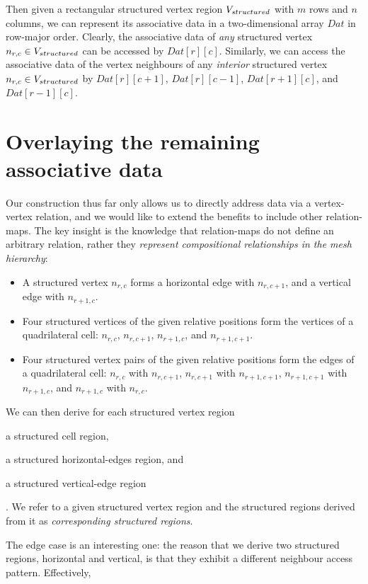 Then given a rectangular structured vertex region $V_{structured}$ with $m$ rows and $n$ columns, we can represent its associative data in a two-dimensional array $Dat$ in row-major order. Clearly, the associative data of \emph{any} structured vertex $n_{r,c} \in V_{structured}$ can be accessed by $Dat[r][c]$. Similarly, we can access the associative data of the vertex neighbours of any \emph{interior} structured vertex $n_{r,c} \in V_{structured}$ by $Dat[r][c+1]$, $Dat[r][c-1]$, $Dat[r+1][c]$, and $Dat[r-1][c]$.


\section{Overlaying the remaining associative data}
Our construction thus far only allows us to directly address data via a vertex-vertex relation, and we would like to extend the benefits to include other relation-maps. The key insight is the knowledge that relation-maps do not define an arbitrary relation, rather they \emph{represent compositional relationships in the mesh hierarchy}:
\begin{itemize}
\item A structured vertex $n_{r,c}$ forms a horizontal edge with $n_{r,c+1}$, and a vertical edge with $n_{r+1,c}$.
\item Four structured vertices of the given relative positions form the vertices of a quadrilateral cell: $n_{r,c}$, $n_{r,c+1}$, $n_{r+1,c}$, and $n_{r+1,c+1}$.
\item Four structured vertex pairs of the given relative positions form the edges of a quadrilateral cell: $n_{r,c}$ with $n_{r,c+1}$, $n_{r,c+1}$ with $n_{r+1,c+1}$, $n_{r+1,c+1}$ with $n_{r+1,c}$, and $n_{r+1,c}$ with $n_{r,c}$.
\end{itemize}


We can then derive for each structured vertex region
\begin{enumerate*}[label=\alph*)]
\item a structured cell region,
\item a structured horizontal-edges region, and
\item a structured vertical-edge region
\end{enumerate*}.
We refer to a given structured vertex region and the structured regions derived from it as \emph{corresponding structured regions}.

The edge case is an interesting one: the reason that we derive two structured regions, horizontal and vertical, is that they exhibit a different neighbour access pattern. Effectively,


